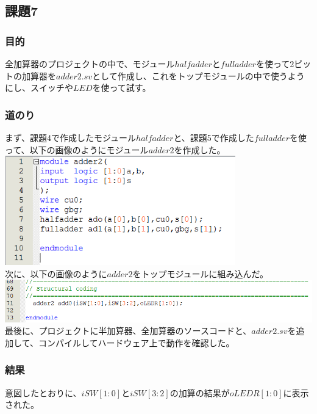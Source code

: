 \documentclass[a4paper]{jarticle}
\begin{document}
\subsection{課題7}
\subsubsection{目的}
全加算器のプロジェクトの中で、モジュール$halfadder$と$fulladder$を使って2ビットの加算器を$adder2.sv$として作成し、これをトップモジュールの中で使うようにし、スイッチや$LED$を使って試す。
\subsubsection{道のり}
まず、課題4で作成したモジュール$halfadder$と、課題5で作成した$fulladder$を使って、以下の画像のようにモジュール$adder2$を作成した。\\
\includegraphics[width=10cm]{work7/7-4.PNG}\\
次に、以下の画像のように$adder2$をトップモジュールに組み込んだ。\\
\includegraphics[width=15cm]{work7/7-1.PNG}\\
最後に、プロジェクトに半加算器、全加算器のソースコードと、$adder2.sv$を追加して、コンパイルしてハードウェア上で動作を確認した。
\subsubsection{結果}
意図したとおりに、$iSW[1:0]$と$iSW[3:2]$の加算の結果が$oLEDR[1:0]$に表示された。
\end{document}

